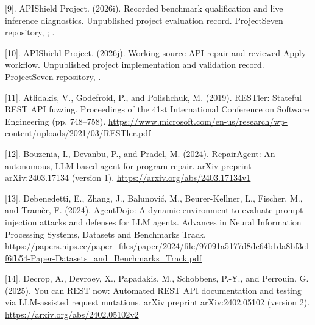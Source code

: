 \documentclass[12pt,a4paper,oneside]{report}
\begin{document}
\begingroup\setlength{\hangindent}{0pt} [9]. APIShield Project. (2026i). Recorded benchmark qualification and live inference diagnostics. Unpublished project evaluation record. ProjectSeven repository, ; .\par\endgroup\vspace{6pt}
\begingroup\setlength{\hangindent}{0pt} [10]. APIShield Project. (2026j). Working source API repair and reviewed Apply workflow. Unpublished project implementation and validation record. ProjectSeven repository, .\par\endgroup\vspace{6pt}
\begingroup\setlength{\hangindent}{0pt} [11]. Atlidakis, V., Godefroid, P., and Polishchuk, M. (2019). RESTler: Stateful REST API fuzzing. Proceedings of the 41st International Conference on Software Engineering (pp. 748–758). \url{https://www.microsoft.com/en-us/research/wp-content/uploads/2021/03/RESTler.pdf}\par\endgroup\vspace{6pt}
\begingroup\setlength{\hangindent}{0pt} [12]. Bouzenia, I., Devanbu, P., and Pradel, M. (2024). RepairAgent: An autonomous, LLM-based agent for program repair. arXiv preprint arXiv:2403.17134 (version 1). \url{https://arxiv.org/abs/2403.17134v1}\par\endgroup\vspace{6pt}
\begingroup\setlength{\hangindent}{0pt} [13]. Debenedetti, E., Zhang, J., Balunović, M., Beurer-Kellner, L., Fischer, M., and Tramèr, F. (2024). AgentDojo: A dynamic environment to evaluate prompt injection attacks and defenses for LLM agents. Advances in Neural Information Processing Systems, Datasets and Benchmarks Track. \url{https://papers.nips.cc/paper_files/paper/2024/file/97091a5177d8dc64b1da8bf3e1f6fb54-Paper-Datasets_and_Benchmarks_Track.pdf}\par\endgroup\vspace{6pt}
\begingroup\setlength{\hangindent}{0pt} [14]. Decrop, A., Devroey, X., Papadakis, M., Schobbens, P.-Y., and Perrouin, G. (2025). You can REST now: Automated REST API documentation and testing via LLM-assisted request mutations. arXiv preprint arXiv:2402.05102 (version 2). \url{https://arxiv.org/abs/2402.05102v2}\par\endgroup\vspace{6pt}
\end{document}
